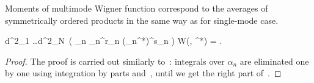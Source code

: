 Moments of multimode Wigner function correspond to the averages of symmetrically ordered products in the same way as for single-mode case.

\begin{theorem}
	\begin{eqn*}
		\int d^2\alpha_1 \ldots \int d^2\alpha_N\,
			\left(
				\prod_n \alpha_n^{r_n} (\alpha_n^*)^{s_n}
			\right) W(\balpha, \balpha^*)
		= \langle {} \rangle.
	\end{eqn*}
\end{theorem}
\begin{proof}
The proof is carried out similarly to~:
integrals over $\alpha_n$ are eliminated one by one using integration by parts and~,
until we get the right part of~.
\end{proof}
